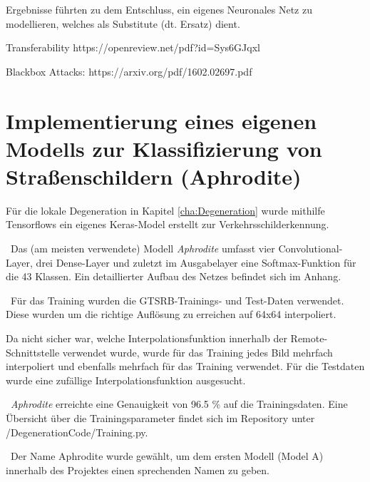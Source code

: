\newlineDiese Ergebnisse führten zu dem Entschluss, ein eigenes Neuronales Netz zu modellieren, welches als Substitute (dt. Ersatz) dient.

Transferability https://openreview.net/pdf?id=Sys6GJqxl

Blackbox Attacks: https://arxiv.org/pdf/1602.02697.pdf

\section{Implementierung eines eigenen Modells zur Klassifizierung von Straßenschildern (Aphrodite)}
Für die lokale Degeneration in Kapitel \ref{cha:Degeneration} wurde mithilfe Tensorflows ein eigenes Keras-Model erstellt zur Verkehrsschilderkennung. 

~\newline Das (am meisten verwendete) Modell \textit{Aphrodite} umfasst vier Convolutional-Layer, drei Dense-Layer und zuletzt im Ausgabelayer eine Softmax-Funktion für die 43 Klassen. Ein detaillierter Aufbau des Netzes befindet sich im Anhang.

~\newline Für das Training wurden die GTSRB-Trainings- und Test-Daten verwendet. Diese wurden um die richtige Auflösung zu erreichen auf 64x64 interpoliert. 

Da nicht sicher war, welche Interpolationsfunktion innerhalb der Remote-Schnittstelle verwendet wurde, wurde für das Training jedes Bild mehrfach interpoliert und ebenfalls mehrfach für das Training verwendet. Für die Testdaten wurde eine zufällige Interpolationsfunktion ausgesucht. 

~\newline \textit{Aphrodite} erreichte eine Genauigkeit von 96.5 \% auf die Trainingsdaten. Eine Übersicht über die Trainingsparameter findet sich im Repository unter /DegenerationCode/Training.py. 

~\newline Der Name Aphrodite wurde gewählt, um dem ersten Modell (Model A) innerhalb des Projektes einen sprechenden Namen zu geben.

